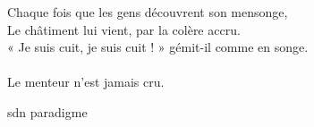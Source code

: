 \documentclass[a4paper,12pt,bibliography=totoc,index=totoc,twoside,francais]{scrbook}
\begin{document}


\frontmatter
\begin{flushright}
Chaque fois que les gens découvrent son mensonge,\\
Le châtiment lui vient, par la colère accru.\\
« Je suis cuit, je suis cuit ! » gémit-il comme en songe.\\
~\\
Le menteur n'est jamais cru.\\
\end{flushright}

\tableofcontents
\listoftables
\listoffigures

\mainmatter








\appendix

%
\gls{sdn}
\gls{paradigme}

\backmatter
\nocite{*}
\printbibliography
\printindex

\printglossaries

\cleardoublepage

\end{document}
